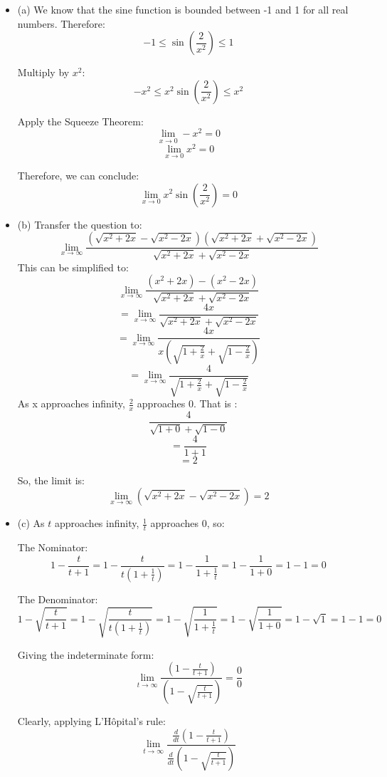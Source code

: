 \documentclass[a4paper, 7pt]{article}
\begin{document}
\begin{itemize}
    \item (a) 
    We know that the sine function is bounded between -1 and 1 for all real numbers. Therefore:
    \[
    -1 \leq \sin\left(\frac{2}{x^2}\right) \leq 1
    \]
    
    Multiply by \( x^2 \):
    \[
    -x^2 \leq x^2 \sin\left(\frac{2}{x^2}\right) \leq x^2
    \]
    
    Apply the Squeeze Theorem:
    \[
    \lim_{x \to 0} -x^2 = 0
    \]
    \[
    \lim_{x \to 0} x^2 = 0
    \]
    
    Therefore, we can conclude:
    \[
    \lim_{x \to 0} x^2 \sin\left(\frac{2}{x^2}\right) = 0
    \]
    \item (b)
    Transfer the question to:
    \[
    \lim\limits_{x \to \infty} \frac{(\sqrt{x^2 + 2x} - \sqrt{x^2 - 2x})(\sqrt{x^2 + 2x} + \sqrt{x^2 - 2x})}{\sqrt{x^2 + 2x} + \sqrt{x^2 - 2x}}
    \]
    This can be simplified to:
    \[
    \lim\limits_{x \to \infty} \frac{(x^2 + 2x) - (x^2 - 2x)}{\sqrt{x^2 + 2x} + \sqrt{x^2 - 2x}}
    \]
    \[ 
    = \lim_{x \to \infty} \frac{4x}{\sqrt{x^2 + 2x} + \sqrt{x^2 - 2x}}
    \]
    \[
    = \lim_{x \to \infty} \frac{4x}{x \left( \sqrt{1 + \frac{2}{x}} + \sqrt{1 - \frac{2}{x}} \right)}
    \]
    \[
    = \lim_{x \to \infty} \frac{4}{\sqrt{1 + \frac{2}{x}} + \sqrt{1 - \frac{2}{x}}}
    \]
    As x approaches infinity, $\frac{2}{x}$ approaches 0. That is :
    \[
    \frac{4}{\sqrt{1 + 0} + \sqrt{1 - 0}} 
    \]
    \[
    = \frac{4}{1 + 1} 
    \] 
    \[ 
    = 2 
    \]

    So, the limit is: \[ \lim_{x \to \infty} \left( \sqrt{x^2 + 2x} - \sqrt{x^2 - 2x} \right) = 2 \]
    \item (c)
    As \( t \) approaches infinity, \( \frac{1}{t} \) approaches 0, so:

    The Nominator: 
    \[
    1 - \frac{t}{t+1} = 1 - \frac{t}{t(1 + \frac{1}{t})} = 1 - \frac{1}{1 + \frac{1}{t}} = 1 - \frac{1}{1 + 0} = 1 - 1 = 0
    \]

    The Denominator: 
    \[
    1 - \sqrt{\frac{t}{t+1}} = 1 - \sqrt{\frac{t}{t(1 + \frac{1}{t})}} = 1 - \sqrt{\frac{1}{1 + \frac{1}{t}}} = 1 - \sqrt{\frac{1}{1 + 0}} = 1 - \sqrt{1} = 1 - 1 = 0
    \]

    Giving the indeterminate form: 
    \[
    \lim_{t \to \infty} \frac{\left(1 - \frac{t}{t+1}\right)} {\left(1 - \sqrt{\frac{t}{t+1}}\right)} = \frac{0}{0}
    \]

    Clearly, applying L'Hôpital's rule:
    \[
    \lim_{t \to \infty} \frac{\frac{d}{dt} \left(1 - \frac{t}{t+1}\right)}{\frac{d}{dt} \left(1 - \sqrt{\frac{t}{t+1}}\right)}
    \]


\end{itemize}
\end{document}
